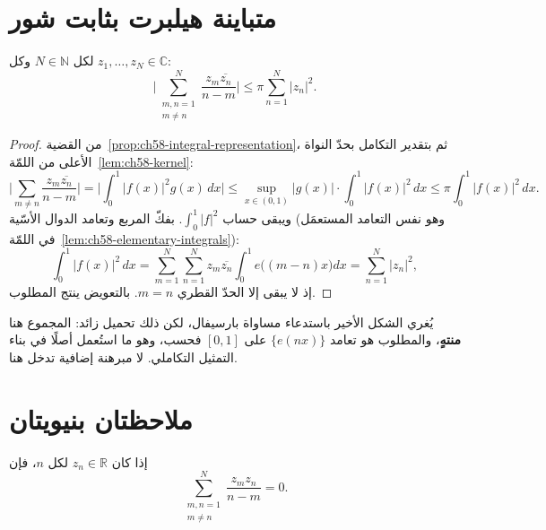\section{متباينة هيلبرت بثابت شور}

\begin{theorem}
\label{thm:ch58-hilbert-inequality}
\provedhere
لكل \(N\in\mathbb{N}\) وكل \(z_1,\dots,z_N\in\mathbb{C}\):
\[
\Biggl\lvert
\sum_{\substack{m,n=1\\m\ne n}}^{N}\frac{z_m\overline{z_n}}{n-m}
\Biggr\rvert
\le
\pi\sum_{n=1}^{N}\lvert z_n\rvert^2.
\]
\end{theorem}

\begin{proof}
من القضية~\ref{prop:ch58-integral-representation}، ثم بتقدير التكامل
بحدّ النواة الأعلى من اللمّة~\ref{lem:ch58-kernel}:
\[
\Biggl\lvert\sum_{m\ne n}\frac{z_m\overline{z_n}}{n-m}\Biggr\rvert
=\Biggl\lvert\int_0^1\lvert f(x)\rvert^2g(x)\,dx\Biggr\rvert
\le\sup_{x\in(0,1)}\lvert g(x)\rvert\cdot\int_0^1\lvert f(x)\rvert^2\,dx
\le\pi\int_0^1\lvert f(x)\rvert^2\,dx.
\]
ويبقى حساب \(\int_0^1\lvert f\rvert^2\). بفكّ المربع وتعامد الدوال
الأسّية (وهو نفس التعامد المستعمَل في
اللمّة~\ref{lem:ch58-elementary-integrals}):
\[
\int_0^1\lvert f(x)\rvert^2\,dx
=\sum_{m=1}^{N}\sum_{n=1}^{N}z_m\overline{z_n}\int_0^1e\bigl((m-n)x\bigr)dx
=\sum_{n=1}^{N}\lvert z_n\rvert^2,
\]
إذ لا يبقى إلا الحدّ القطري \(m=n\). بالتعويض ينتج المطلوب.
\end{proof}

\begin{remark}
\label{rem:ch58-no-parseval}
يُغري الشكل الأخير باستدعاء مساواة بارسيفال، لكن ذلك تحميل زائد: المجموع
هنا \textbf{منتهٍ}، والمطلوب هو تعامد \(\{e(nx)\}\) على \([0,1]\) فحسب،
وهو ما استُعمل أصلًا في بناء التمثيل التكاملي. لا مبرهنة إضافية تدخل هنا.
\end{remark}

\section{ملاحظتان بنيويتان}

\begin{proposition}
\label{prop:ch58-real-vanishing}
\provedhere
إذا كان \(z_n\in\mathbb{R}\) لكل \(n\)، فإن
\[
\sum_{\substack{m,n=1\\m\ne n}}^{N}\frac{z_mz_n}{n-m}=0.
\]
\end{proposition}

